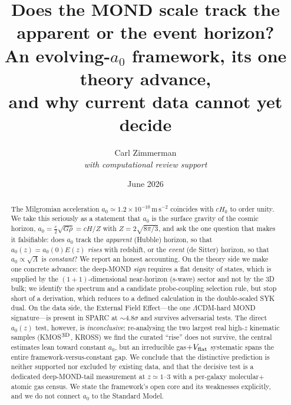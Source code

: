 \documentclass[11pt]{article}
\title{\bf Does the MOND scale track the apparent or the event horizon?\\
An evolving-$a_0$ framework, its one theory advance,\\ and why current data cannot yet decide}
\author{Carl Zimmerman\\[2pt]\small\it with computational review support}
\date{June 2026}
\newcommand{\az}{a_0}
\newcommand{\Ez}{E(z)}
\begin{document}
\maketitle

\begin{abstract}
\noindent
The Milgromian acceleration $\az\simeq1.2\times10^{-10}\,\mathrm{m\,s^{-2}}$ coincides with $cH_0$ to
order unity. We take this seriously as a statement that $\az$ is the surface gravity of the cosmic
horizon, $\az=\tfrac{c}{2}\sqrt{G\rho}=cH/Z$ with $Z=2\sqrt{8\pi/3}$, and ask the one question that
makes it falsifiable: does $\az$ track the \emph{apparent} (Hubble) horizon, so that $\az(z)=\az(0)\Ez$
\emph{rises} with redshift, or the \emph{event} (de Sitter) horizon, so that $\az\propto\sqrt{\Lambda}$
is \emph{constant}? We report an honest accounting. On the theory side we make one concrete advance: the
deep-MOND \emph{sign} requires a flat density of states, which is supplied by the $(1{+}1)$-dimensional
near-horizon (s-wave) sector and not by the $3$D bulk; we identify the spectrum and a candidate
probe-coupling selection rule, but stop short of a derivation, which reduces to a defined calculation in
the double-scaled SYK dual. On the data side, the External Field Effect---the one ${\Lambda}$CDM-hard
MOND signature---is present in SPARC at ${\sim}4.8\sigma$ and survives adversarial tests. The direct
$\az(z)$ test, however, is \emph{inconclusive}: re-analysing the two largest real high-$z$ kinematic
samples (KMOS$^{\rm 3D}$, KROSS) we find the curated ``rise'' does not survive, the central estimates
lean toward constant $\az$, but an irreducible gas$+V_{\rm flat}$ systematic spans the entire
framework-versus-constant gap. We conclude that the distinctive prediction is neither supported nor
excluded by existing data, and that the decisive test is a dedicated deep-MOND-tail measurement at
$z\simeq1$--$3$ with a per-galaxy molecular$+$atomic gas census. We state the framework's open core and
its weaknesses explicitly, and we do not connect $\az$ to the Standard Model.
\end{abstract}
\end{document}

